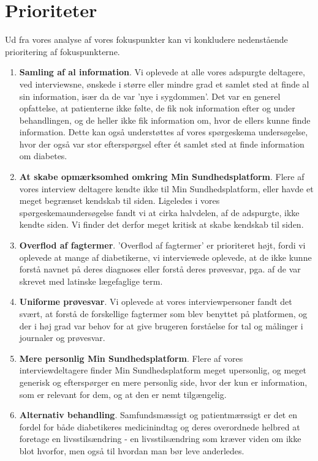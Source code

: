 \section{Prioriteter}
Ud fra vores analyse af vores fokuspunkter kan vi konkludere  nedenstående prioritering af fokuspunkterne.\\
\begin{enumerate}
	\item \textbf{Samling af al information}. Vi oplevede at alle vores adspurgte deltagere, ved interviewsne, ønskede i større eller mindre grad et samlet sted at finde al sin information, især da de var 'nye i sygdommen'. Det var en generel opfattelse, at patienterne ikke følte, de fik nok information efter og under behandlingen, og de heller ikke fik information om, hvor de ellers kunne finde information. Dette kan også understøttes af vores spørgeskema undersøgelse, hvor der også var stor efterspørgsel efter ét samlet sted at finde information om diabetes.
	\item \textbf{At skabe opmærksomhed omkring Min Sundhedsplatform}. Flere af vores interview deltagere kendte ikke til Min Sundhedsplatform, eller havde et meget begrænset kendskab til siden. Ligeledes i vores spørgeskemaundersøgelse fandt vi at cirka halvdelen, af de adspurgte, ikke kendte siden. Vi finder det derfor meget kritisk at skabe kendskab til siden.
	\item \textbf{Overflod af fagtermer}. 'Overflod af fagtermer' er prioriteret højt, fordi vi oplevede at mange af diabetikerne, vi interviewede oplevede, at de ikke kunne forstå navnet på deres diagnoses eller forstå deres prøvesvar, pga. af de var skrevet med latinske lægefaglige term.
	\item \textbf{Uniforme prøvesvar}. Vi oplevede at vores interviewpersoner fandt det svært, at forstå de forskellige fagtermer som blev benyttet på platformen, og der i høj grad var behov for at give brugeren forståelse for tal og målinger i journaler og prøvesvar.
	\item \textbf{Mere personlig Min Sundhedsplatform}. Flere af vores interviewdeltagere finder Min Sundhedsplatform meget upersonlig, og meget generisk og efterspørger en mere personlig side, hvor der kun er information, som er relevant for dem, og at den er nemt tilgængelig.
	\item \textbf{Alternativ behandling}. Samfundsmæssigt og patientmærssigt er det en fordel for både diabetikeres medicinindtag og deres overordnede helbred at foretage en livsstilsændring - en livsstilsændring som kræver viden om ikke blot hvorfor, men også til hvordan man bør leve anderledes.

\end{enumerate}
